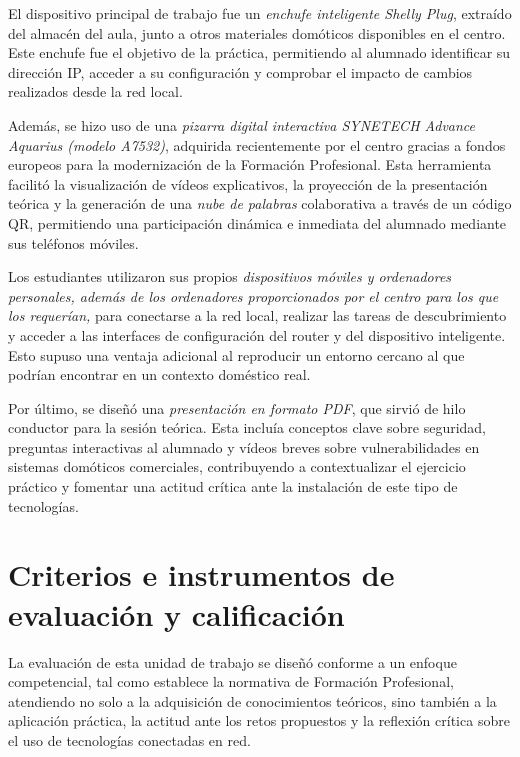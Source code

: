 El dispositivo principal de trabajo fue un \textit{enchufe inteligente Shelly Plug}, extraído del almacén del aula, junto a otros materiales domóticos disponibles en el centro. Este enchufe fue el objetivo de la práctica, permitiendo al alumnado identificar su dirección IP, acceder a su configuración y comprobar el impacto de cambios realizados desde la red local.

Además, se hizo uso de una \textit{pizarra digital interactiva SYNETECH Advance Aquarius (modelo A7532)}, adquirida recientemente por el centro gracias a fondos europeos para la modernización de la Formación Profesional. Esta herramienta facilitó la visualización de vídeos explicativos, la proyección de la presentación teórica y la generación de una \textit{nube de palabras} colaborativa a través de un código QR, permitiendo una participación dinámica e inmediata del alumnado mediante sus teléfonos móviles.

Los estudiantes utilizaron sus propios \textit{dispositivos móviles y ordenadores personales, además de los ordenadores proporcionados por el centro para los que los requerían,} para conectarse a la red local, realizar las tareas de descubrimiento y acceder a las interfaces de configuración del router y del dispositivo inteligente. Esto supuso una ventaja adicional al reproducir un entorno cercano al que podrían encontrar en un contexto doméstico real.

Por último, se diseñó una \textit{presentación en formato PDF}, que sirvió de hilo conductor para la sesión teórica. Esta incluía conceptos clave sobre seguridad, preguntas interactivas al alumnado y vídeos breves sobre vulnerabilidades en sistemas domóticos comerciales, contribuyendo a contextualizar el ejercicio práctico y fomentar una actitud crítica ante la instalación de este tipo de tecnologías.


\section{Criterios e instrumentos de evaluación y calificación}

La evaluación de esta unidad de trabajo se diseñó conforme a un enfoque competencial, tal como establece la normativa de Formación Profesional, atendiendo no solo a la adquisición de conocimientos teóricos, sino también a la aplicación práctica, la actitud ante los retos propuestos y la reflexión crítica sobre el uso de tecnologías conectadas en red.


